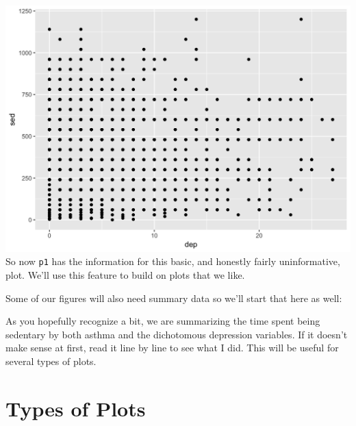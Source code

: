 \documentclass[]{tufte-book}
\newenvironment{Shaded}{}{}
\newcommand{\KeywordTok}[1]{\textcolor[rgb]{0.00,0.44,0.13}{\textbf{#1}}}
\newcommand{\DataTypeTok}[1]{\textcolor[rgb]{0.56,0.13,0.00}{#1}}
\newcommand{\StringTok}[1]{\textcolor[rgb]{0.25,0.44,0.63}{#1}}
\newcommand{\OtherTok}[1]{\textcolor[rgb]{0.00,0.44,0.13}{#1}}
\newcommand{\OperatorTok}[1]{\textcolor[rgb]{0.40,0.40,0.40}{#1}}
\newcommand{\NormalTok}[1]{#1}
\theoremstyle{definition}
\theoremstyle{definition}
\theoremstyle{remark}
\begin{document}
\includegraphics{_main_files/figure-latex/unnamed-chunk-133-1} So now
\texttt{p1} has the information for this basic, and honestly fairly
uninformative, plot. We'll use this feature to build on plots that we
like.

Some of our figures will also need summary data so we'll start that here
as well:

\begin{Shaded}
\end{Shaded}

As you hopefully recognize a bit, we are summarizing the time spent
being sedentary by both asthma and the dichotomous depression variables.
If it doesn't make sense at first, read it line by line to see what I
did. This will be useful for several types of plots.

\section*{Types of Plots}\label{types-of-plots}
\end{document}
